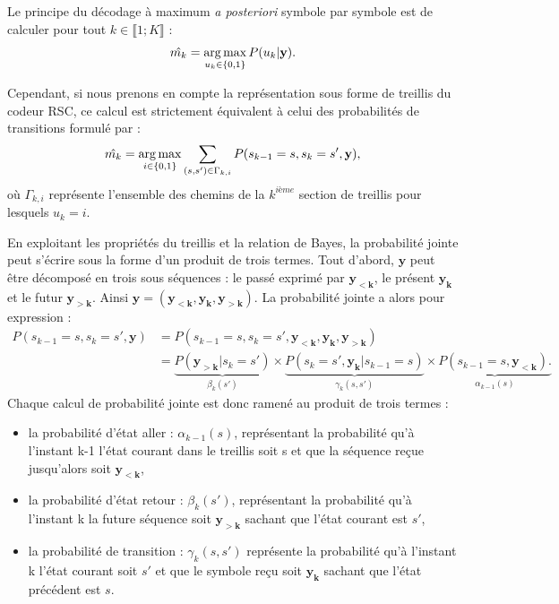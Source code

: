 Le principe du décodage à maximum \textit{a posteriori} symbole par symbole est de calculer pour tout $k\in \llbracket1;K\rrbracket$ : 
\begin{equation}
	\label{eq:maprule}
	\hat{m_k} = \operatorname*{arg\,max}\limits_{u_k\in\{0,1\}} P(u_k| \mathbf{y}).	
\end{equation}

Cependant, si nous prenons en compte la représentation sous forme de treillis du codeur RSC, ce calcul est strictement équivalent à celui des probabilités de transitions formulé par : 
\[\hat{m_k} = \operatorname*{arg\,max}_{i\in\{0,1\}} \sum\limits_{(s,s')\in\Gamma_{k,i}}P(s_{k-1}=s, s_{k}=s',\mathbf{y}),\]
où $\Gamma_{k,i}$ représente l'ensemble des chemins de la ${k^{ième}}$ section de treillis pour lesquels $u_k=i$. 

En exploitant les propriétés du treillis et la relation de Bayes, la probabilité jointe peut s'écrire sous la forme d'un produit de trois termes. Tout d'abord, $\mathbf{y}$ peut être décomposé en trois sous séquences : le passé exprimé par $\mathbf{y_{<k}}$, le présent $\mathbf{y_k}$ et le futur $\mathbf{y_{>k}}$. Ainsi $\mathbf{y} = (\mathbf{y_{<k}}, \mathbf{y_k}, \mathbf{y_{>k}}).$ La probabilité jointe a alors pour expression : 
\begin{align*}
	P(s_{k-1}=s, s_{k}=s',\mathbf{y}) & = P(s_{k-1}=s, s_{k}=s',\mathbf{y_{<k}},\mathbf{y_{k}},\mathbf{y_{>k}})                                                                                                                              \\
	                                  & = \underbrace{P(\mathbf{y_{>k}}|s_{k}=s')}_{\beta_k(s')}\times \underbrace{P(s_{k}=s',\mathbf{y_{k}}|s_{k-1}=s)}_{\gamma_k(s,s')}\times \underbrace{P(s_{k-1}=s,\mathbf{y_{<k}}).}_{\alpha_{k-1}(s)} 
\end{align*}
Chaque calcul de probabilité jointe est donc ramené au produit de trois termes :
\begin{itemize}
	\item la probabilité d'état aller : $\alpha_{k-1}(s)$, représentant la probabilité qu'à l'instant k-1 l'état courant dans le treillis soit s et que la séquence reçue jusqu'alors soit $\mathbf{y_{<k}}$,
	\item la probabilité d'état retour : $\beta_k(s')$, représentant la probabilité qu'à l'instant k la future séquence soit $\mathbf{y_{>k}}$ sachant que l'état courant est $s'$,
	\item la probabilité de transition : $\gamma_k(s,s')$ représente la probabilité qu'à l'instant k l'état courant soit $s'$ et que le symbole reçu soit $\mathbf{y_k}$ sachant que l'état précédent est $s$.
\end{itemize}
